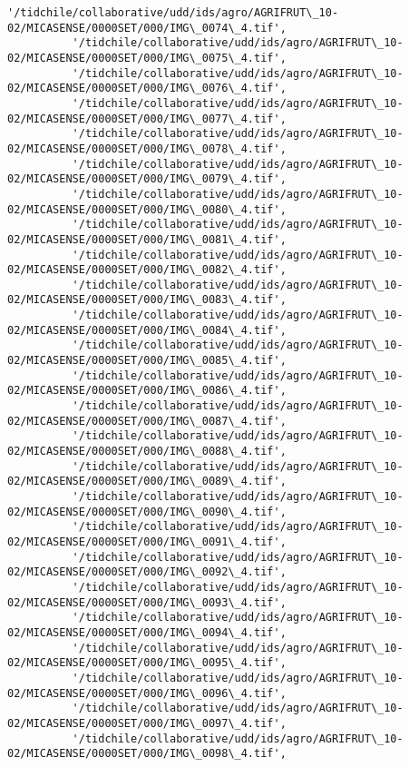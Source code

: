 \documentclass[11pt]{article}
\begin{document}
\begin{Verbatim}[commandchars=\\\{\}]
          '/tidchile/collaborative/udd/ids/agro/AGRIFRUT\_10-02/MICASENSE/0000SET/000/IMG\_0074\_4.tif',
          '/tidchile/collaborative/udd/ids/agro/AGRIFRUT\_10-02/MICASENSE/0000SET/000/IMG\_0075\_4.tif',
          '/tidchile/collaborative/udd/ids/agro/AGRIFRUT\_10-02/MICASENSE/0000SET/000/IMG\_0076\_4.tif',
          '/tidchile/collaborative/udd/ids/agro/AGRIFRUT\_10-02/MICASENSE/0000SET/000/IMG\_0077\_4.tif',
          '/tidchile/collaborative/udd/ids/agro/AGRIFRUT\_10-02/MICASENSE/0000SET/000/IMG\_0078\_4.tif',
          '/tidchile/collaborative/udd/ids/agro/AGRIFRUT\_10-02/MICASENSE/0000SET/000/IMG\_0079\_4.tif',
          '/tidchile/collaborative/udd/ids/agro/AGRIFRUT\_10-02/MICASENSE/0000SET/000/IMG\_0080\_4.tif',
          '/tidchile/collaborative/udd/ids/agro/AGRIFRUT\_10-02/MICASENSE/0000SET/000/IMG\_0081\_4.tif',
          '/tidchile/collaborative/udd/ids/agro/AGRIFRUT\_10-02/MICASENSE/0000SET/000/IMG\_0082\_4.tif',
          '/tidchile/collaborative/udd/ids/agro/AGRIFRUT\_10-02/MICASENSE/0000SET/000/IMG\_0083\_4.tif',
          '/tidchile/collaborative/udd/ids/agro/AGRIFRUT\_10-02/MICASENSE/0000SET/000/IMG\_0084\_4.tif',
          '/tidchile/collaborative/udd/ids/agro/AGRIFRUT\_10-02/MICASENSE/0000SET/000/IMG\_0085\_4.tif',
          '/tidchile/collaborative/udd/ids/agro/AGRIFRUT\_10-02/MICASENSE/0000SET/000/IMG\_0086\_4.tif',
          '/tidchile/collaborative/udd/ids/agro/AGRIFRUT\_10-02/MICASENSE/0000SET/000/IMG\_0087\_4.tif',
          '/tidchile/collaborative/udd/ids/agro/AGRIFRUT\_10-02/MICASENSE/0000SET/000/IMG\_0088\_4.tif',
          '/tidchile/collaborative/udd/ids/agro/AGRIFRUT\_10-02/MICASENSE/0000SET/000/IMG\_0089\_4.tif',
          '/tidchile/collaborative/udd/ids/agro/AGRIFRUT\_10-02/MICASENSE/0000SET/000/IMG\_0090\_4.tif',
          '/tidchile/collaborative/udd/ids/agro/AGRIFRUT\_10-02/MICASENSE/0000SET/000/IMG\_0091\_4.tif',
          '/tidchile/collaborative/udd/ids/agro/AGRIFRUT\_10-02/MICASENSE/0000SET/000/IMG\_0092\_4.tif',
          '/tidchile/collaborative/udd/ids/agro/AGRIFRUT\_10-02/MICASENSE/0000SET/000/IMG\_0093\_4.tif',
          '/tidchile/collaborative/udd/ids/agro/AGRIFRUT\_10-02/MICASENSE/0000SET/000/IMG\_0094\_4.tif',
          '/tidchile/collaborative/udd/ids/agro/AGRIFRUT\_10-02/MICASENSE/0000SET/000/IMG\_0095\_4.tif',
          '/tidchile/collaborative/udd/ids/agro/AGRIFRUT\_10-02/MICASENSE/0000SET/000/IMG\_0096\_4.tif',
          '/tidchile/collaborative/udd/ids/agro/AGRIFRUT\_10-02/MICASENSE/0000SET/000/IMG\_0097\_4.tif',
          '/tidchile/collaborative/udd/ids/agro/AGRIFRUT\_10-02/MICASENSE/0000SET/000/IMG\_0098\_4.tif',

\end{Verbatim}
\end{document}
